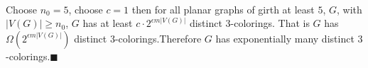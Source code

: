 \documentclass[letterpaper,12pt,oneside,onecolumn]{report}
\begin{document}
\paragraph{}
Choose $n_0 = 5$, choose $c = 1$ then for all planar graphs of girth at least $5$, $G$, with $|V(G)| \geq n_0$, $G$ has at least $c \cdot 2^{\epsilon m |V(G)|}$ distinct $3$-colorings. That is $G$ has $\Omega(2^{\epsilon m |V(G)|})$ distinct $3$-colorings.Therefore $G$ has exponentially many distinct $3$-colorings.$\blacksquare$
\end{document}
